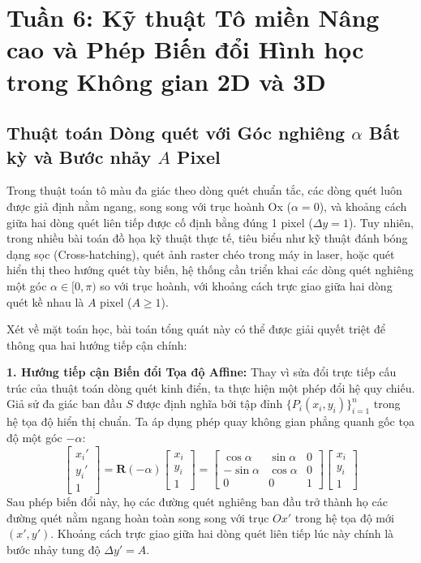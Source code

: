 \section{Tuần 6: Kỹ thuật Tô miền Nâng cao và Phép Biến đổi Hình học trong Không gian 2D và 3D}
\label{sec:week6}

\subsection{Thuật toán Dòng quét với Góc nghiêng \texorpdfstring{$\alpha$}{alpha} Bất kỳ và Bước nhảy \texorpdfstring{$A$}{A} Pixel}
\label{subsec:scanline_arbitrary_angle}

Trong thuật toán tô màu đa giác theo dòng quét chuẩn tắc, các dòng quét luôn được giả định nằm ngang, song song với trục hoành Ox ($\alpha = 0$), và khoảng cách giữa hai dòng quét liên tiếp được cố định bằng đúng 1 pixel ($\Delta y = 1$). Tuy nhiên, trong nhiều bài toán đồ họa kỹ thuật thực tế, tiêu biểu như kỹ thuật đánh bóng dạng sọc (Cross-hatching), quét ảnh raster chéo trong máy in laser, hoặc quét hiển thị theo hướng quét tùy biến, hệ thống cần triển khai các dòng quét nghiêng một góc $\alpha \in [0, \pi)$ so với trục hoành, với khoảng cách trực giao giữa hai dòng quét kề nhau là $A$ pixel ($A \ge 1$).

Xét về mặt toán học, bài toán tổng quát này có thể được giải quyết triệt để thông qua hai hướng tiếp cận chính:

\textbf{1. Hướng tiếp cận Biến đổi Tọa độ Affine:}
Thay vì sửa đổi trực tiếp cấu trúc của thuật toán dòng quét kinh điển, ta thực hiện một phép đổi hệ quy chiếu. Giả sử đa giác ban đầu $S$ được định nghĩa bởi tập đỉnh $\{P_i(x_i, y_i)\}_{i=1}^n$ trong hệ tọa độ hiển thị chuẩn. Ta áp dụng phép quay không gian phẳng quanh gốc tọa độ một góc $-\alpha$:
\begin{equation}
\label{eq:scanline_rotate_points}
\begin{bmatrix} x_i' \\ y_i' \\ 1 \end{bmatrix} = \mathbf{R}(-\alpha) \begin{bmatrix} x_i \\ y_i \\ 1 \end{bmatrix} = \begin{bmatrix} \cos\alpha & \sin\alpha & 0 \\ -\sin\alpha & \cos\alpha & 0 \\ 0 & 0 & 1 \end{bmatrix} \begin{bmatrix} x_i \\ y_i \\ 1 \end{bmatrix}
\end{equation}
Sau phép biến đổi này, họ các đường quét nghiêng ban đầu trở thành họ các đường quét nằm ngang hoàn toàn song song với trục $Ox'$ trong hệ tọa độ mới $(x', y')$. Khoảng cách trực giao giữa hai dòng quét liên tiếp lúc này chính là bước nhảy tung độ $\Delta y' = A$.

